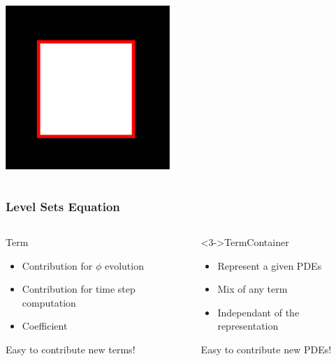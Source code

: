 \begin{frame}
\begin{columns}
{\begin{center}
 \includegraphics[width=0.8\textwidth]{../Art/MalcolmLayers.png}
\end{center}
}

\end{columns}

\end{frame}


\begin{frame}
\frametitle{Level Sets Equation}

\begin{columns}
  \begin{block}{Term}
    \begin{itemize}
      \item Contribution for $\phi$ evolution
      \item Contribution for time step computation
      \item Coefficient
    \end{itemize} 
  \alert<2>{Easy to contribute new terms!}
  \end{block}

  \begin{block}<3->{TermContainer}
    \begin{itemize}
      \item Represent a given PDEs
      \item Mix of any term
      \item Independant of the representation
    \end{itemize}
  \alert<4>{Easy to contribute new PDEs!}
  \end{block}

\end{columns}

\end{frame}

